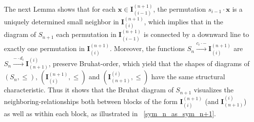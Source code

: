 \documentclass[a4 paper,12pt]{article}
\begin{document}
The next Lemma shows that for each $\textbf{x}\in \textbf{I}_{(i-1)}^{(n+1)}$, the permutation $s_{i-1}\cdot  \textbf{x}$ is a uniquely determined small neighbor in $\textbf{I}_{(i)}^{(n+1)}$, which implies that in the diagram of $S_{n+1}$  each permutation in  $\textbf{I}_{(i-1)}^{(n+1)}$ is connected by a downward line to exactly one permutation in $\textbf{I}_{(i)}^{(n+1)}$. Moreover,   the functions  $S_n \xrightarrow{c_{i}\cdot  -} \textbf{I}_{(i)}^{(n+1)}$ are $S_n \xrightarrow{ -\cdot  d_{i}} \textbf{I}^{(i)}_{(n+1)}$,  preserve Bruhat-order, which yield that the shapes of diagrams of $(S_{n},\leqslant )$,  $(\textbf{I}_{(i)}^{(n+1)} , \leqslant )$ and $(\textbf{I}^{(i)}_{(n+1)} , \leqslant )$  have the same structural characteristic. Thus it shows that the Bruhat diagram of $S_{n+1}$ visualizes the neighboring-relationships both between blocks of the form $\textbf{I}_{(i)}^{(n+1)}$ (and $\textbf{I}_{(n+1)}^{(i)}$) as well as within each block, as illustrated in  ~\ref{sym_n_as_sym_n+1}.
\end{document}
